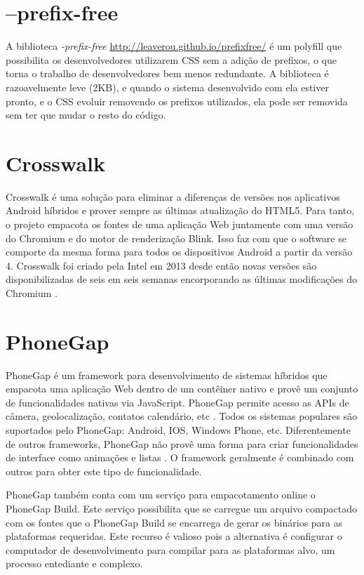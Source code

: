 \section{--prefix-free}

A biblioteca \textit{-prefix-free} \url{http://leaverou.github.io/prefixfree/}
é um polyfill que possibilita os desenvolvedores utilizarem CSS sem
a adição de prefixos, o que torna o trabalho de desenvolvedores bem
menos redundante. A biblioteca é razoavelmente leve (2KB), e quando o
sistema desenvolvido com ela estiver pronto, e o CSS evoluir removendo os
prefixos utilizados, ela pode ser removida sem ter que mudar o resto do código.

\section{Crosswalk} \label{crosswalk}

Crosswalk é uma solução para eliminar a diferenças de versões nos
aplicativos Android híbridos e prover sempre as últimas atualização
do HTML5. Para tanto, o projeto empacota os fontes de uma aplicação
Web juntamente com uma versão do Chromium e do motor de renderização
Blink. Isso faz com que o software se comporte da mesma forma para todos
os dispositivos Android a partir da versão 4. Crosswalk foi criado
pela Intel em 2013 desde então novas versões são disponibilizadas
de seis em seis semanas encorporando as últimas modificações do Chromium
\autocite{crosswalkProject}.

\section{PhoneGap}

PhoneGap é um framework para desenvolvimento de sistemas híbridos que
empacota uma aplicação Web dentro de um contêiner nativo e provê um
conjunto de funcionalidades nativas via JavaScript. PhoneGap permite
acesso as APIs de câmera, geolocalização, contatos calendário,
etc \autocite[p. 3]{crossPlatformAppsAnimations}. Todos os sistemas
populares são suportados pelo PhoneGap: Android, IOS, Windows Phone,
etc. Diferentemente de outros frameworks, PhoneGap não provê uma
forma para criar funcionalidades de interface como animações e listas
\autocite[p. 15]{viabilityBusinessApplications}. O framework 
geralmente é combinado com outros para obter este tipo de funcionalidade.

PhoneGap também conta com um serviço para empacotamento online o
PhoneGap Build. Este serviço possibilita que se carregue um arquivo
compactado com os fontes que o PhoneGap Build se encarrega de gerar os
binários para as plataformas requeridas. Este recurso é valioso pois a
alternativa é configurar o computador de desenvolvimento para compilar
para as plataformas alvo, um processo entediante e complexo.

